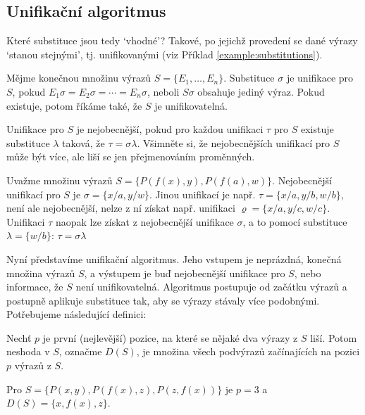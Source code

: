 \subsection{Unifikační algoritmus}

Které substituce jsou tedy `vhodné'? Takové, po jejichž provedení se dané výrazy `stanou stejnými', tj. \alert{unifikovanými} (viz Příklad \ref{example:substitutions}).

\begin{definition}[Unifikace]
    Mějme konečnou množinu výrazů $S=\{E_1,\dots,E_n\}$. Substituce $\sigma$ je \alert{unifikace pro $S$}, pokud $E_1\sigma=E_2\sigma=\cdots =E_n\sigma$, neboli $S\sigma$ obsahuje jediný výraz. Pokud existuje, potom říkáme také, že $S$ je \alert{unifikovatelná}. 
    
    Unifikace pro $S$ je \alert{nejobecnější}, pokud pro každou unifikaci $\tau$ pro $S$ existuje substituce $\lambda$ taková, že $\tau=\sigma\lambda$. Všimněte si, že nejobecnějších unifikací pro $S$ může být více, ale liší se jen přejmenováním proměnných.
\end{definition}

\begin{example}
   Uvažme množinu výrazů $S=\{P(f(x),y),P(f(a),w)\}$. Nejobecnější unifikací pro $S$ je $\sigma=\{x/a,y/w\}$. Jinou unifikací je např. $\tau=\{x/a,y/b,w/b\}$, není ale nejobecnější, nelze z ní získat např. unifikaci $\varrho=\{x/a, y/c, w/c\}$. Unifikaci $\tau$ naopak lze získat z nejobecnější unifikace $\sigma$, a to pomocí substituce $\lambda=\{w/b\}$: $\tau=\sigma\lambda$
\end{example}

Nyní představíme \alert{unifikační algoritmus}. Jeho vstupem je neprázdná, konečná množina výrazů $S$, a výstupem je buď nejobecnější unifikace pro $S$, nebo informace, že $S$ není unifikovatelná. Algoritmus postupuje od začátku výrazů a postupně aplikuje substituce tak, aby se výrazy stávaly více podobnými. Potřebujeme následující definici:

Nechť $p$ je první (nejlevější) pozice, na které se nějaké dva výrazy z $S$ liší. Potom \alert{neshoda v $S$}, označme $D(S)$, je množina všech podvýrazů začínajících na pozici $p$ výrazů z $S$.

\begin{example}
Pro $S=\{P(x,y),P(f(x),z),P(z,f(x))\}$ je $p=3$ a $D(S)=\{x,f(x),z\}$.  
\end{example}

